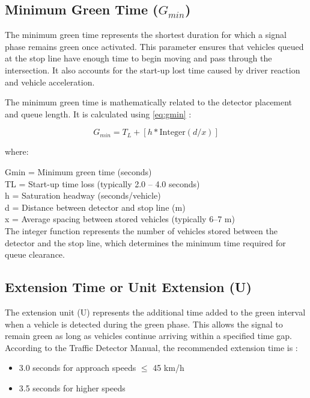  \subsection{Minimum Green Time ($G_{min}$)}
 The minimum green time represents the shortest duration 
 for which a signal phase remains green once activated. 
 This parameter ensures that vehicles queued at the stop 
 line have enough time to begin moving and pass through 
 the intersection. It also accounts for the start-up lost 
 time caused by driver reaction and vehicle acceleration\cite{duraku2024}.

 The minimum green time is mathematically related to the 
 detector placement and queue length. It is calculated 
 using \cref{eq:gmin} \cite{duraku2024}:

\begin{equation}
    G_{min} = T_L + [h * \text{Integer}(d / x)]
    \label{eq:gmin}
\end{equation}
 
where:

Gmin = Minimum green time (seconds) \\
TL = Start-up time loss (typically 2.0 – 4.0 seconds) \\
h = Saturation headway (seconds/vehicle) \\
d = Distance between detector and stop line (m) \\
x = Average spacing between stored vehicles (typically 6–7 m) \\

	
The integer function represents the number of vehicles
stored between the detector and the stop line, which 
determines the minimum time required for queue clearance.


 \subsection{Extension Time or Unit Extension (U)}
 The extension unit (U) represents the additional time added 
 to the green interval when a vehicle is detected during the 
 green phase. This allows the signal to remain green as long 
 as vehicles continue arriving within a specified time gap. 
 According to the Traffic Detector Manual, the recommended 
 extension time is \cite{duraku2024}:
 \begin{itemize}
    \item 3.0 seconds for approach speeds $\le$ 45 km/h
    \item 3.5 seconds for higher speeds
 \end{itemize}

